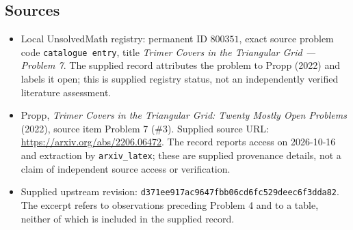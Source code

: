 \documentclass[11pt]{article}
\begin{document}
\subsection{Sources}
\begin{itemize}
\item Local UnsolvedMath registry: permanent ID \(800351\), exact source problem code \texttt{catalogue entry}, title \emph{Trimer Covers in the Triangular Grid --- Problem 7}. The supplied record attributes the problem to Propp (2022) and labels it open; this is supplied registry status, not an independently verified literature assessment.
\item Propp, \emph{Trimer Covers in the Triangular Grid: Twenty Mostly Open Problems} (2022), source item Problem 7 (\#3). Supplied source URL: \url{https://arxiv.org/abs/2206.06472}. The record reports access on 2026-10-16 and extraction by \texttt{arxiv\_latex}; these are supplied provenance details, not a claim of independent source access or verification.
\item Supplied upstream revision: \texttt{d371ee917ac9647fbb06cd6fc529deec6f3dda82}. The excerpt refers to observations preceding Problem 4 and to a table, neither of which is included in the supplied record.
\end{itemize}
\end{document}
